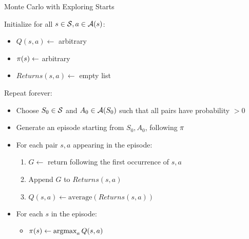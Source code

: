 
\begin{algorithm}
\caption{Monte Carlo with Exploring Starts}
\label{alg:mces}

Initialize for all $s \in \mathcal{S}, a \in \mathcal{A}(s)$:
\begin{itemize}[noitemsep,topsep=0pt]
	\item $Q(s,a) \gets$ arbitrary
	\item $\pi(s) \gets$ arbitrary
	\item $\textit{Returns}(s,a) \gets$ empty list
\end{itemize}


Repeat forever:
\begin{itemize}[noitemsep,topsep=0pt]
	\item Choose $S_0 \in \mathcal{S}$ and $A_0 \in \mathcal{A}(S_0)$
		such that all pairs have probability $> 0$
	\item Generate an episode starting from $S_0,A_0$, following $\pi$
	\item For each pair $s,a$ appearing in the episode:
		\begin{enumerate}[noitemsep,topsep=0pt]
		\item $G \gets$ return following the first occurrence of $s,a$
		\item Append $G$ to $\textit{Returns}(s,a)$
		\item $Q(s,a) \gets \text{average}(\textit{Returns}(s,a))$
		\end{enumerate}
	\item For each $s$ in the episode:
		\begin{itemize}[noitemsep,topsep=0pt]
			\item $\pi(s) \gets \operatorname*{argmax}_a Q(s,a)$
		\end{itemize}
\end{itemize}

\end{algorithm}
